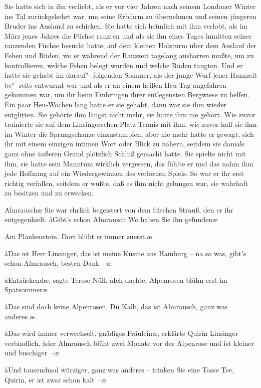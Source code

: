 Sie hatte sich in ihn verliebt, als er vor vier Jahren nach
seinem Londoner Winter ins Tal zurückgekehrt war, um seine
Erbfarm zu übernehmen und seinen jüngeren Bruder ins
Ausland zu schicken. Sie hatte sich heimlich mit ihm verlobt,
als im März jenes Jahres die Füchse ranzten und als sie ihn
eines Tages inmitten seiner ranzenden Füchse besucht hatte,
auf dem kleinen Holzturm über dem Auslauf der Fehen und
Rüden, wo er während der Ranzzeit tagelang ausharren
mußte, um zu kontrollieren, welche Fehen belegt wurden
und welche Rüden taugten. Und er hatte sie gehabt im darauf"-%
folgenden Sommer, als der junge Wurf jener Ranzzeit be"-%
reits entwurmt war und als er an einem heißen Heu-Tag
angefahren gekommen war, um ihr beim Einbringen ihrer
entlegensten Bergwiese zu helfen. Ein paar Heu-Wochen
lang hatte er sie gehabt, dann war sie ihm wieder entglitten.
Sie gehörte ihm längst nicht mehr, sie hatte ihm nie gehört.
Wie zuvor trainierte sie auf dem Linsingerschen Platz Tennis
mit ihm, wie zuvor half sie ihm im Winter die Sprungschanze
einzustampfen, aber nie mehr hatte er gewagt, sich ihr mit
einem einzigen intimen Wort oder Blick zu nähern, seitdem
sie damals ganz ohne äußeren Grund plötzlich Schluß gemacht
hatte. Sie spielte nicht mit ihm, sie hatte sein Manntum
wirklich vergessen, das fühlte er und das nahm ihm jede
Hoffnung auf ein Wiedergewinnen des verlornen Spiels. So
war er ihr erst richtig verfallen, seitdem er wußte, daß es
ihm nicht gelungen war, sie wahrhaft zu besitzen und zu
erwecken.

\aanah{}Almrausch\ausr{}\ae{} Sie war ehrlich begeistert von dem frischen
Strauß, den er ihr entgegenhielt. \aa{}Gibt's schon Almrausch\frag{}
Wo haben Sie ihn gefunden\frag{}\ae{}

\aanah{}Am Plankenstein. Dort blüht er immer zuerst.\ae{}

\aa{}Das ist Herr Linsinger, das ist meine Kusine aus Hamburg --
na so was, gibt's schon Almrausch, besten Dank~--\ae{}

\aa{}Entzückend\ae{}, sagte Terese Nüll. \aa{}Ich dachte, Alpenrosen
blühn erst im Spätsommer\frag{}\ae{}

\aa{}Das sind doch keine Alpenrosen, Du Kalb, das ist Almrausch,
ganz was anderes.\ae{}

\aa{}Das wird immer verwechselt, gnädiges Fräulein\ae{}, erklärte
Quirin Linsinger verbindlich, \aa{}der Almrausch blüht zwei
Monate vor der Alpenrose und ist kleiner und buschiger~--\ae{}

\aa{}Und tausendmal würziger, ganz was anderes -- trinken Sie
eine Tasse Tee, Quirin, er ist zwar schon kalt~--\ae{}

